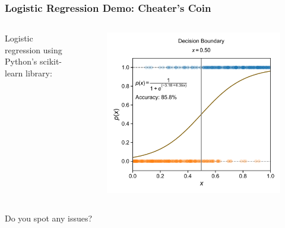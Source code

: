 \documentclass[10pt,aspectratio=169]{beamer}
\begin{document}
      \begin{frame}
        \frametitle{Logistic Regression Demo: Cheater’s Coin}
        \begin{columns}[T]
          \begin{column}{0.5\textwidth}
            Logistic regression using Python's scikit-learn library:
            
            \inputminted[fontsize=\scriptsize]{python}{sample_lr_coin.py}
          \end{column}

          \begin{column}{0.5\textwidth}
            \begin{figure}[t]
              \includegraphics[width=\textwidth]{scripts/coin_fit_lr.pdf}
            \end{figure}
          \end{column}
        \end{columns}

        Do you spot any issues?
      \end{frame}

     
\end{document}
